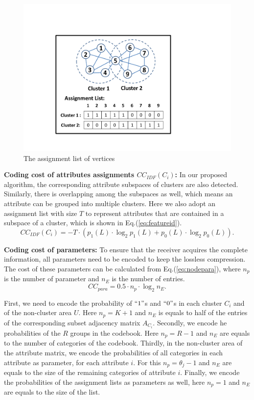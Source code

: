 \begin{figure}[h]
\centering
\includegraphics[width = 0.7\columnwidth]{figure/list.pdf}
\vspace{-3mm}
\caption{The assignment list of vertices}
\label{fig:list}
\end{figure}

\noindent \textbf{Coding cost of attributes assignments $CC_{IDF}(C_i)$: }
In our proposed algorithm, the corresponding attribute subspaces of clusters are also detected. Similarly, there is overlapping among the subspaces as well, which means an attribute can be grouped into multiple clusters. Here we also adopt an assignment list with size $T$ to represent attributes that are contained in a subspace of a cluster, which is shown in Eq.(\ref{eq:featureid}).
\begin{equation}
CC_{IDF}(C_i)= - T \cdot ( p_{1}(L) \cdot \log_2 {p_{1}(L)} + p_{0}(L) \cdot \log_2 {p_{0}(L)}).
\label{eq:featureid}
\end{equation}

\noindent \textbf{Coding cost of parameters:} To ensure that the receiver acquires the complete information, all parameters need to be encoded to keep the lossless compression. The cost of these parameters can be calculated from Eq.(\ref{eq:nodepara}), where $n_p$ is the number of parameter and $n_E$ is the number of entries. 
\begin{equation}
CC_{para}= 0.5 \cdot n_p \cdot \log_2 n_E.
\label{eq:nodepara}
\end{equation}

First, we need to encode the probability of $``1"$s and $``0"$s in each cluster $C_i$ and of the non-cluster area $U$. Here $n_p = K + 1$ and $n_E$ is equals to half of the entries of the corresponding subset adjacency matrix $A_{C_i}$. Secondly, we encode he probabilities of  the $R$ groups in the codebook. Here $n_p = R-1$ and $n_E$ are equals to the number of categories of the codebook. Thirdly, in the non-cluster area of the attribute matrix, we encode the probabilities of all categories in each attribute as parameter, for each attribute $i$. For this $n_p = \theta_j -1$ and $n_E$ are equals to the size of the remaining categories of attribute $i$. Finally, we encode the probabilities of the assignment lists as parameters as well, here $n_p = 1$ and $n_E$ are equals to the size of the list. 

